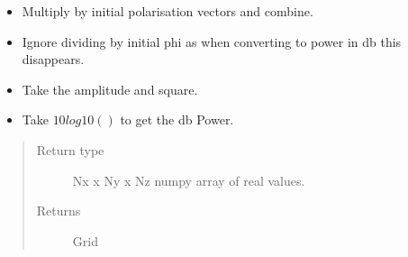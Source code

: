 \documentclass[letterpaper,10pt,english]{sphinxmanual}
\begin{document}
\begin{fulllineitems}
\begin{itemize}
\item {} 
Multiply by initial polarisation vectors and combine.

\item {} 
Ignore dividing by initial phi as when converting to power in db     this disappears.

\item {} 
Take the amplitude and square.

\item {} 
Take \(10log10()\) to get the db Power.

\end{itemize}
\begin{quote}\begin{description}
\item[{Return type}] \leavevmode
Nx x Ny x Nz numpy array of real values.

\item[{Returns}] \leavevmode
Grid

\end{description}\end{quote}

\end{fulllineitems}

\end{document}
